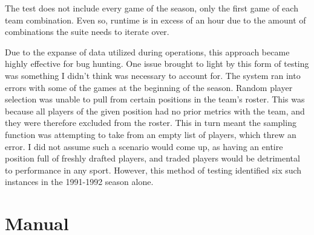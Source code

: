 \documentclass{thesis-ekf}
\theoremstyle{definition}
\theoremstyle{remark}
\begin{document}
The test does not include every game of the season, only the first game of each team combination. Even so, runtime is in excess of an hour due to the amount of combinations the suite needs to iterate over.

Due to the expanse of data utilized during operations, this approach became highly effective for bug hunting. One issue brought to light by this form of testing was something I didn't think was necessary to account for. The system ran into errors with some of the games at the beginning of the season. Random player selection was unable to pull from certain positions in the team's roster. This was because all players of the given position had no prior metrics with the team, and they were therefore excluded from the roster. This in turn meant the sampling function was attempting to take from an empty list of players, which threw an error. I did not assume such a scenario would come up, as having an entire position full of freshly drafted players, and traded players would be detrimental to performance in any sport. However, this method of testing identified six such instances in the 1991-1992 season alone.

\chapter{Manual}
\end{document}
